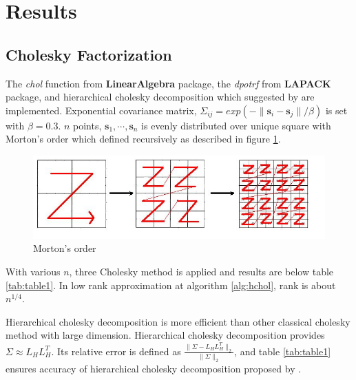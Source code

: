 \section{Results}

\subsection{Cholesky Factorization}
The \textit{chol} function from \textbf{LinearAlgebra} package, the \textit{dpotrf} from \textbf{LAPACK} package, and hierarchical cholesky decomposition which suggested by \citet{hackbusch2015hierarchical} are implemented. Exponential covariance matrix, $\Sigma_{ij}=exp(-\lVert \mathbf{s}_i-\mathbf{s}_j \rVert/\beta)$ is set with $\beta=0.3$. $n$ points, $\mathbf{s}_1,\cdots,\mathbf{s}_n$ is evenly distributed over unique square with Morton's order which defined recursively as described in figure \ref{fig:morton}.

\begin{figure}[h]
\centering
	\includegraphics[width=.5\linewidth]{figs/Morton.jpg}
	\caption{Morton's order\citep{salem2016comparative}}
	\label{fig:morton}
\end{figure}

With various $n$, three Cholesky method is applied and results are below table \ref{tab:table1}. In low rank approximation at algorithm \ref{alg:hchol}, rank is about $n^{1/4}$.

\begin{table}[h]
	\centering
	\caption{}
	\label{tab:table1}
\end{table}
Hierarchical cholesky decomposition is more efficient than other classical cholesky method with large dimension. Hierarchical cholesky decomposition provides $\Sigma\approx L_HL_H^T$. Its relative error is defined as $\frac{\lVert\Sigma-L_HL_H^T\rVert_2}{\lVert\Sigma\rVert_2}$, and table \ref{tab:table1} ensures accuracy of hierarchical cholesky decomposition proposed by \citet{hackbusch2015hierarchical}.


